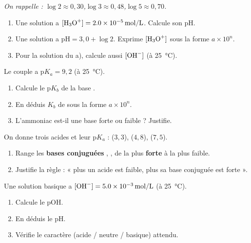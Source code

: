 \documentclass[11pt,a4paper]{article}
\begin{document}
\begin{center}\small\itshape On rappelle : $\log 2 \approx 0{,}30$,\quad $\log 3 \approx 0{,}48$,\quad $\log 5 \approx 0{,}70$.\end{center}

\begin{exo}
\begin{enumerate}[label=\alph*)]
  \item Une solution a $[\ce{H3O+}] = \qty{2,0e-5}{mol\per L}$. Calcule son pH.
  \item Une solution a $\mathrm{pH} = 3{,}0 + \log 2$. Exprime $[\ce{H3O+}]$ sous la forme $a\times10^{n}$.
  \item Pour la solution du a), calcule aussi $[\ce{OH-}]$ (à \qty{25}{\celsius}).
\end{enumerate}
\end{exo}

\begin{exo}
Le couple  a $\mathrm{p}K_a = 9{,}2$ (à \qty{25}{\celsius}).
\begin{enumerate}[label=\alph*)]
  \item Calcule le $\mathrm{p}K_b$ de la base .
  \item En déduis $K_b$ de  sous la forme $a\times10^{n}$.
  \item L'ammoniac est-il une base forte ou faible ? Justifie.
\end{enumerate}
\end{exo}

\begin{exo}
On donne trois acides et leur $\mathrm{p}K_a$ :  ($3{,}3$),  ($4{,}8$),  ($7{,}5$).
\begin{enumerate}[label=\alph*)]
  \item Range les \textbf{bases conjuguées} , ,  de la plus \textbf{forte} à la
        plus faible.
  \item Justifie la règle : « plus un acide est faible, plus sa base conjuguée est forte ».
\end{enumerate}
\end{exo}

\begin{exo}
Une solution basique a $[\ce{OH-}] = \qty{5,0e-3}{mol\per L}$ (à \qty{25}{\celsius}).
\begin{enumerate}[label=\alph*)]
  \item Calcule le pOH.
  \item En déduis le pH.
  \item Vérifie le caractère (acide / neutre / basique) attendu.
\end{enumerate}
\end{exo}
\end{document}
